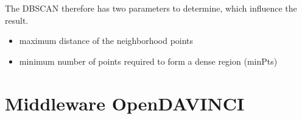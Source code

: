 The \ac {DBSCAN} therefore has two parameters to determine, which influence the result.
\begin{itemize}
 \item maximum distance of the neighborhood points
 \item minimum number of points required to form a dense region (minPts)
\end{itemize}

\section{Middleware OpenDAVINCI}

